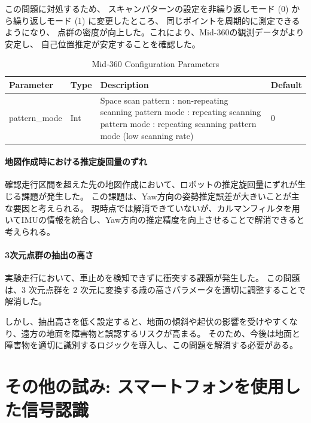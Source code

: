 \documentclass[twocolumn,9pt]{jsproceedings}
\begin{document}
この問題に対処するため、
スキャンパターンの設定を非繰り返しモード (0) から繰り返しモード (1) に変更したところ、
同じポイントを周期的に測定できるようになり、
点群の密度が向上した。これにより、Mid-360の観測データがより安定し、
自己位置推定が安定することを確認した。

\begin{table}[h]
  \centering
  \begin{tabular}{|l|l|p{3cm}|l|}
      \hline
      \textbf{Parameter} & \textbf{Type} & \textbf{Description} & \textbf{Default} \\
      \hline
      pattern\_mode & Int & Space scan pattern \newline
      0: non-repeating scanning pattern mode \newline
      1: repeating scanning pattern mode \newline
      2: repeating scanning pattern mode (low scanning rate) & 0 \\
      \hline
  \end{tabular}
  \caption{Mid-360 Configuration Parameters}
  \label{tab:lidar_params}
\end{table}



\paragraph{地図作成時における推定旋回量のずれ}
確認走行区間を超えた先の地図作成において、ロボットの推定旋回量にずれが生じる課題が発生した。
この課題は、Yaw方向の姿勢推定誤差が大きいことが主な要因と考えられる。
現時点では解消できていないが、カルマンフィルタを用いてIMUの情報を統合し、Yaw方向の推定精度を向上させることで解消できると考えられる。

\paragraph{3次元点群の抽出の高さ}
実験走行において、車止めを検知できずに衝突する課題が発生した。
この問題は、3 次元点群を 2 次元に変換する歳の高さパラメータを適切に調整することで解消した。

しかし、抽出高さを低く設定すると、地面の傾斜や起伏の影響を受けやすくなり、遠方の地面を障害物と誤認するリスクが高まる。
そのため、今後は地面と障害物を適切に識別するロジックを導入し、この問題を解消する必要がある。

\section{その他の試み: スマートフォンを使用した信号認識}
\end{document}
